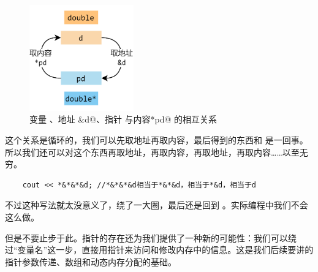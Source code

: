 \begin{figure}[htbp]
    \centering
    \includegraphics[width=0.4\textwidth]{../images/generalized_parts/05_relationship_between_variables_and_pointers_300.png}
    \caption{变量 \lstinline@d@、地址 \lstinline@&d@、指针 \lstinline@pd@ 与内容\lstinline@*pd@ 的相互关系}
\end{figure}
这个关系是循环的，我们可以先取地址再取内容，最后得到的东西和 \lstinline@d@ 是一回事。所以我们还可以对这个东西再取地址，再取内容，再取地址，再取内容……以至无穷。
\begin{lstlisting}
    cout << *&*&*&d; //*&*&*&d相当于*&*&d，相当于*&d，相当于d
\end{lstlisting}
不过这种写法就太没意义了，绕了一大圈，最后还是回到 \lstinline@d@。实际编程中我们不会这么做。\par
但是不要止步于此。指针的存在还为我们提供了一种新的可能性：我们可以绕过``变量名''这一步，直接用指针来访问和修改内存中的信息。这是我们后续要讲的指针参数传递、数组和动态内存分配的基础。\par
